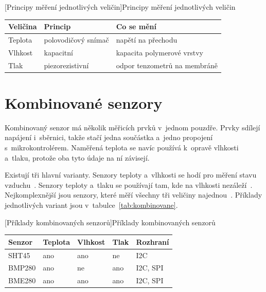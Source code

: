 \begin{center}
\noindent\begin{minipage}{\textwidth}
[Principy měření jednotlivých veličin]{Principy měření jednotlivých veličin~\cite{ti,rotronic,bmp280}}
\label{tab:principy}
\small
\renewcommand{\arraystretch}{1.25}
\begin{tabularx}{\textwidth}{|Y{0.8}|Y{1.1}|Y{1.1}|}
\hline
\textbf{Veličina} & \textbf{Princip} & \textbf{Co se mění} \\
\hline
Teplota & polovodičový snímač & napětí na přechodu \\
\hline
Vlhkost & kapacitní & kapacita polymerové vrstvy \\
\hline
Tlak & piezorezistivní & odpor tenzometrů na membráně \\
\hline
\end{tabularx}
\end{minipage}
\end{center}

\section{Kombinované senzory}

Kombinovaný senzor má několik měřicích prvků v~jednom pouzdře. Prvky sdílejí napájení i~sběrnici, takže stačí jedna součástka a~jedno propojení s~mikrokontrolérem. Naměřená teplota se navíc používá k~opravě vlhkosti a~tlaku, protože oba tyto údaje na ní závisejí.

Existují tři hlavní varianty. Senzory teploty a~vlhkosti se hodí pro měření stavu vzduchu~\cite{sht4x}. Senzory teploty a~tlaku se používají tam, kde na vlhkosti nezáleží~\cite{bmp280}. Nejkomplexnější jsou senzory, které měří všechny tři veličiny najednou~\cite{bme280}. Příklady jednotlivých variant jsou v~tabulce~\ref{tab:kombinovane}.

\begin{center}
\noindent\begin{minipage}{\textwidth}
[Příklady kombinovaných senzorů]{Příklady kombinovaných senzorů~\cite{bmp280,sht4x,bme280}}
\label{tab:kombinovane}
\small
\renewcommand{\arraystretch}{1.25}
\begin{tabularx}{\textwidth}{|Y{1.0}|Y{0.8}|Y{0.8}|Y{0.8}|Y{1.6}|}
\hline
\textbf{Senzor} & \textbf{Teplota} & \textbf{Vlhkost} & \textbf{Tlak} & \textbf{Rozhraní} \\
\hline
SHT45 & ano & ano & ne & I2C \\
\hline
BMP280 & ano & ne & ano & I2C, SPI \\
\hline
BME280 & ano & ano & ano & I2C, SPI \\
\hline
\end{tabularx}
\end{minipage}
\end{center}

